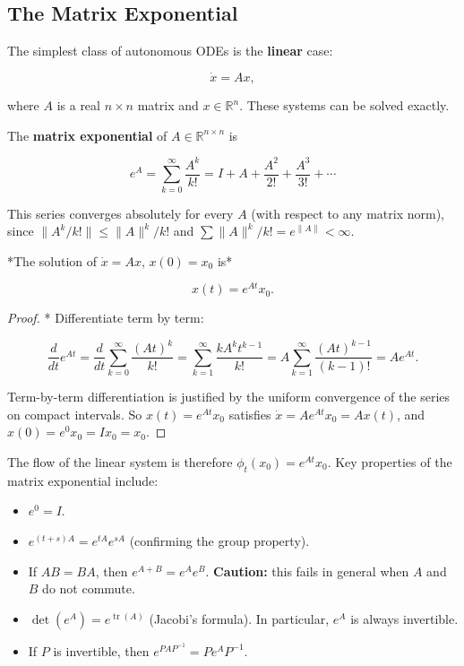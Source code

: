 \subsection{The Matrix Exponential}\label{sec:3.3.1}

The simplest class of autonomous ODEs is the \textbf{linear} case:

\begin{equation}\label{eq:3.3}\tag{3.3}
\dot{x} = Ax,
\end{equation}

where $A$ is a real $n \times n$ matrix and $x \in \mathbb{R}^n$. These systems can be solved exactly.

\begin{definition}\label{def:3.3.}
The \textbf{matrix exponential} of $A \in \mathbb{R}^{n \times n}$ is

\[
e^A = \sum_{k=0}^{\infty} \frac{A^k}{k!} = I + A + \frac{A^2}{2!} + \frac{A^3}{3!} + \cdots
\]

This series converges absolutely for every $A$ (with respect to any matrix norm), since $\|A^k/k!\| \leq \|A\|^k/k!$ and $\sum \|A\|^k/k! = e^{\|A\|} < \infty$.
\end{definition}


\begin{proposition}\label{prop:3.4.}
*The solution of $\dot{x} = Ax$, $x(0) = x_0$ is*

\[
x(t) = e^{At} x_0.
\]
\end{proposition}


\begin{proof}
* Differentiate term by term:

\[
\frac{d}{dt} e^{At} = \frac{d}{dt} \sum_{k=0}^{\infty} \frac{(At)^k}{k!} = \sum_{k=1}^{\infty} \frac{k A^k t^{k-1}}{k!} = A \sum_{k=1}^{\infty} \frac{(At)^{k-1}}{(k-1)!} = A e^{At}.
\]

Term-by-term differentiation is justified by the uniform convergence of the series on compact intervals. So $x(t) = e^{At}x_0$ satisfies $\dot{x} = Ae^{At}x_0 = Ax(t)$, and $x(0) = e^0 x_0 = Ix_0 = x_0$.
\end{proof}


The flow of the linear system is therefore $\phi_t(x_0) = e^{At}x_0$. Key properties of the matrix exponential include:

\begin{itemize}[nosep]
  \item $e^{0} = I$.
  \item $e^{(t+s)A} = e^{tA} e^{sA}$ (confirming the group property).
  \item If $AB = BA$, then $e^{A+B} = e^A e^B$. \textbf{Caution:} this fails in general when $A$ and $B$ do not commute.
  \item $\det(e^A) = e^{\operatorname{tr}(A)}$ (Jacobi's formula). In particular, $e^A$ is always invertible.
  \item If $P$ is invertible, then $e^{PAP^{-1}} = P e^A P^{-1}$.
\end{itemize}


